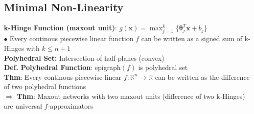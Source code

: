 \subsection*{Minimal Non-Linearity}
\textbf{k-Hinge Function (maxout unit)}: $g(\mathbf x)=\max_{j=1}^k\{\pmb\theta_j^T\mathbf x+b_j\}$\\
$\bullet$ Every continous piecewise linear function $f$ can be written as a signed sum of k-Hinges with $k\leq n+1$\\
\textbf{Polyhedral Set:} Intersection of half-planes (convex)\\
\textbf{Def. Polyhedral Function}: epigraph$(f)$ is polyhedral set\\
\textbf{Thm}: Every continous piecewise linear $f:\mathbb R^n \to \mathbb R$ can be written as the difference of two polyhedral functions\\
$\Rightarrow$ \textbf{Thm}: Maxout networks with two maxout units (difference of two k-Hinges) are universal $f$-approximators

\color{red}